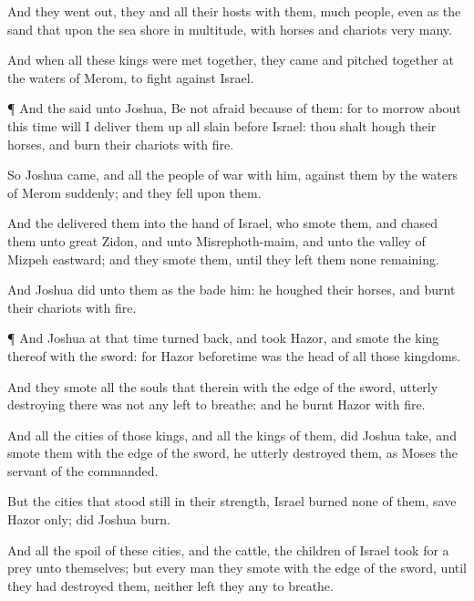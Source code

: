 {And they went
out, they and all their
hosts with them,
much
people, even as the
sand that
{} upon the
sea
shore in
multitude, with
horses and
chariots
very
many.

And when all these
kings were met
together, they
came and
pitched
together at the
waters of
Merom, to
fight against
Israel.


\par }{\PP {}¶ And the
{}
said unto
Joshua, Be not
afraid
because of them: for to
morrow about this
time will I deliver them
up all
slain
before
Israel: thou shalt
hough their
horses, and
burn their
chariots with
fire.

So
Joshua
came, and all the
people of
war with him, against them by the
waters of
Merom
suddenly; and they fell
upon them.

And the
{}
delivered them into the
hand of
Israel, who
smote them, and
chased them unto
great
Zidon, and unto
Misrephoth-maim, and unto the
valley of
Mizpeh
eastward; and they
smote them, until they
left them none
remaining.

And
Joshua
did unto them as the
{}
bade him: he
houghed their
horses, and
burnt their
chariots with
fire.


\par }{\PP {}¶ And
Joshua at that
time turned
back, and
took
Hazor, and
smote the
king thereof with the
sword: for
Hazor
beforetime was the
head of all those
kingdoms.

And they
smote all the
souls that
{} therein with the
edge of the
sword, utterly
destroying
{} there was not any
left to
breathe: and he
burnt
Hazor with
fire.

And all the
cities of those
kings, and all the
kings of them, did
Joshua
take, and
smote them with the
edge of the
sword,
{} he utterly
destroyed them, as
Moses the
servant of the
{}
commanded.

But
{} the
cities that
stood still in their
strength,
Israel
burned none of them,
save
Hazor only;
{} did
Joshua
burn.

And all the
spoil of these
cities, and the
cattle, the
children of
Israel took for a
prey unto themselves; but every
man they
smote with the
edge of the
sword, until they had
destroyed them, neither
left they any to
breathe.


}
